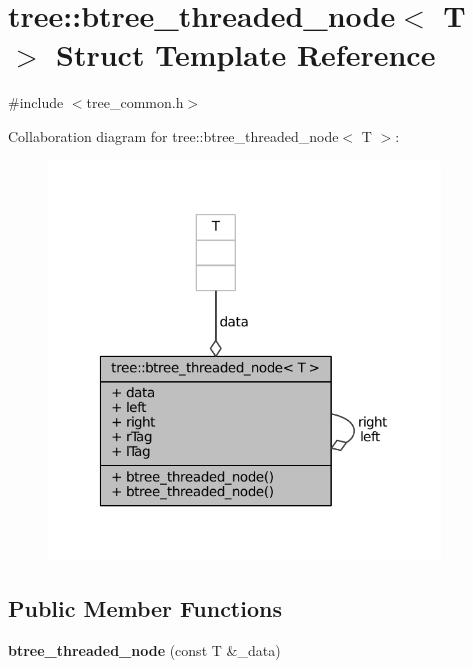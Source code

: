 \hypertarget{structtree_1_1btree__threaded__node}{\section{tree\-:\-:btree\-\_\-threaded\-\_\-node$<$ \-T $>$ \-Struct \-Template \-Reference}
\label{structtree_1_1btree__threaded__node}
}


{\ttfamily \#include $<$tree\-\_\-common.\-h$>$}



\-Collaboration diagram for tree\-:\-:btree\-\_\-threaded\-\_\-node$<$ \-T $>$\-:
\nopagebreak
\begin{figure}[H]
\begin{center}
\leavevmode
\includegraphics[width=295pt]{structtree_1_1btree__threaded__node__coll__graph}
\end{center}
\end{figure}
\subsection*{\-Public \-Member \-Functions}
\begin{DoxyCompactItemize}
\item 
\hypertarget{structtree_1_1btree__threaded__node_a2752127b5320f35b87cd1e347db586f5}{{\bfseries btree\-\_\-threaded\-\_\-node} (const \-T \&\-\_\-data)}\label{structtree_1_1btree__threaded__node_a2752127b5320f35b87cd1e347db586f5}

\end{DoxyCompactItemize}
